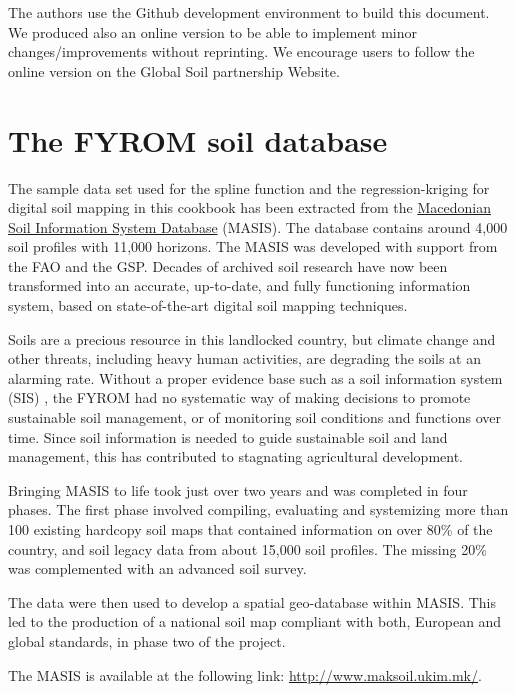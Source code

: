 \documentclass[10pt,b5paper,]{book}
\theoremstyle{definition}
\theoremstyle{definition}
\theoremstyle{definition}
\theoremstyle{remark}
\begin{document}
The authors use the Github development environment to build this
document. We produced also an online version to be able to implement
minor changes/improvements without reprinting. We encourage users to
follow the online version on the Global Soil partnership Website.

\hypertarget{the-fyrom-soil-database}{%
\section{The FYROM soil database}\label{the-fyrom-soil-database}}

The sample data set used for the spline function and the
regression-kriging for digital soil mapping in this cookbook has been
extracted from the \href{http://www.maksoil.ukim.mk/}{Macedonian Soil
Information System Database} (MASIS). The database contains around 4,000
soil profiles with 11,000 horizons. The MASIS was developed with support
from the FAO and the GSP. Decades of archived soil research have now
been transformed into an accurate, up-to-date, and fully functioning
information system, based on state-of-the-art digital soil mapping
techniques.

Soils are a precious resource in this landlocked country, but climate
change and other threats, including heavy human activities, are
degrading the soils at an alarming rate. Without a proper evidence base
such as a soil information system (SIS)
, the FYROM had no
systematic way of making decisions to promote sustainable soil
management, or of monitoring soil conditions and functions over time.
Since soil information is needed to guide sustainable soil and land
management, this has contributed to stagnating agricultural development.

Bringing MASIS to life took just over two years and was completed in
four phases. The first phase involved compiling, evaluating and
systemizing more than 100 existing hardcopy soil maps that contained
information on over 80\% of the country, and soil legacy data from about
15,000 soil profiles. The missing 20\% was complemented with an advanced
soil survey.

The data were then used to develop a spatial geo-database within MASIS.
This led to the production of a national soil map compliant with both,
European and global standards, in phase two of the project.

The MASIS is available at the following link:
\url{http://www.maksoil.ukim.mk/}.
\end{document}
